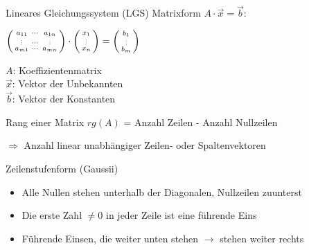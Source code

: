         \begin{definition}{Lineares Gleichungssystem (LGS)}
            Matrixform $A\cdot\vec{x}=\vec{b}$:

            \begin{minipage}{0.55\linewidth}
                $\begin{psmallmatrix} a_{11} & \cdots & a_{1n} \\ \scalebox{0.5}{\vdots} & \cdots & \scalebox{0.5}{\vdots} \\ a_{m1} & \cdots & a_{mn} \end{psmallmatrix} \cdot \begin{psmallmatrix}
                    x_1 \\ \scalebox{0.5}{\vdots} \\ x_n
                \end{psmallmatrix} = \begin{psmallmatrix}
                    b_1 \\ \scalebox{0.5}{\vdots} \\ b_m
                \end{psmallmatrix}$
            \end{minipage}
            \begin{minipage}
                {0.45\linewidth}
                {\small
                $A$: Koeffizientenmatrix\\
                $\vec{x}$: Vektor der Unbekannten\\
                $\vec{b}$: Vektor der Konstanten}
            \end{minipage}
        \end{definition}

    
        \begin{theorem}{Rang einer Matrix} $rg(A)$ = Anzahl Zeilen - Anzahl Nullzeilen
            
            $\Rightarrow$ Anzahl linear unabhängiger Zeilen- oder Spaltenvektoren
        \end{theorem}


\begin{concept}{Zeilenstufenform (Gaussii)}
    \begin{itemize}
        \item Alle Nullen stehen unterhalb der Diagonalen, Nullzeilen zuunterst
        \item Die erste Zahl $\neq 0$ in jeder Zeile ist eine führende Eins
        \item Führende Einsen, die weiter unten stehen $\rightarrow$ stehen weiter rechts
    \end{itemize}
\end{concept}

